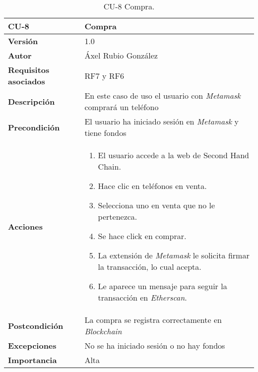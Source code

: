 \begin{table}[p]
	\centering
	\begin{tabularx}{\linewidth}{ p{} p{} }
		\toprule
		\textbf{CU-8}    & \textbf{Compra}\\
		\toprule
		\textbf{Versión}              & 1.0    \\
		\textbf{Autor}                & Áxel Rubio González \\
		\textbf{Requisitos asociados} & RF7 y RF6 \\
		\textbf{Descripción}          & En este caso de uso el usuario con \textit{Metamask} comprará un teléfono  \\
		\textbf{Precondición}         & El usuario ha iniciado sesión en \textit{Metamask} y tiene fondos \\
		\textbf{Acciones}             &
		\begin{enumerate}
			\def\labelenumi{\arabic{enumi}.}
			\tightlist
			\item El usuario accede a la web de Second Hand Chain.
			\item Hace clic en teléfonos en venta.
                \item Selecciona uno en venta que no le pertenezca.
                \item Se hace click en comprar.
                \item La extensión de \textit{Metamask} le solicita firmar la transacción, lo cual acepta.
                \item Le aparece un mensaje para seguir la transacción en \textit{Etherscan}.
		\end{enumerate}\\
		\textbf{Postcondición}        & La compra se registra correctamente en \textit{Blockchain} \\
		\textbf{Excepciones}          & No se ha iniciado sesión o no hay fondos \\
		\textbf{Importancia}          & Alta \\
		\bottomrule
	\end{tabularx}
	\caption{CU-8 Compra.}
\end{table}